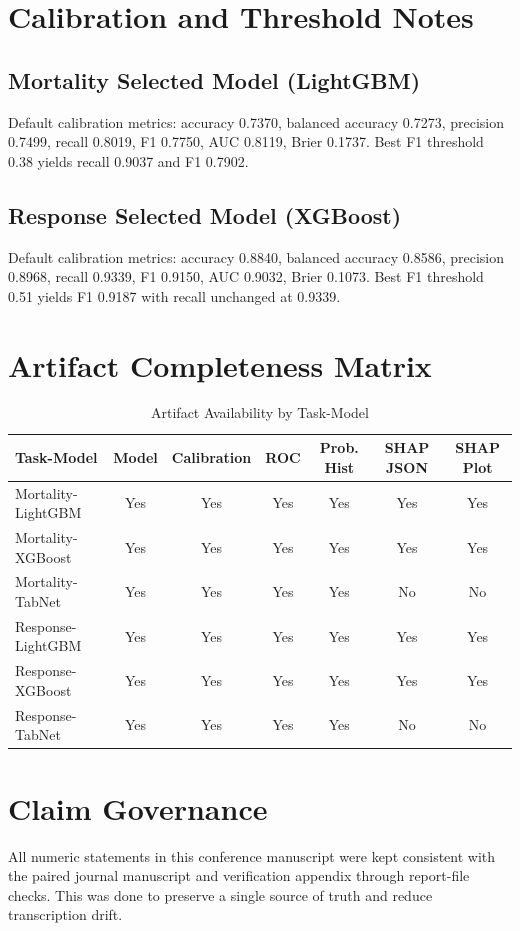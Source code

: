 \documentclass[conference]{IEEEtran}
\begin{document}
\section{Calibration and Threshold Notes}
\subsection{Mortality Selected Model (LightGBM)}
Default calibration metrics: accuracy 0.7370, balanced accuracy 0.7273, precision 0.7499, recall 0.8019, F1 0.7750, AUC 0.8119, Brier 0.1737. Best F1 threshold 0.38 yields recall 0.9037 and F1 0.7902.

\subsection{Response Selected Model (XGBoost)}
Default calibration metrics: accuracy 0.8840, balanced accuracy 0.8586, precision 0.8968, recall 0.9339, F1 0.9150, AUC 0.9032, Brier 0.1073. Best F1 threshold 0.51 yields F1 0.9187 with recall unchanged at 0.9339.

\section{Artifact Completeness Matrix}
\begin{table}[htbp]
\caption{Artifact Availability by Task-Model}
\centering
\small
\begin{tabular}{lcccccc}
\toprule
Task-Model & Model & Calibration & ROC & Prob. Hist & SHAP JSON & SHAP Plot \\
\midrule
Mortality-LightGBM & Yes & Yes & Yes & Yes & Yes & Yes \\
Mortality-XGBoost & Yes & Yes & Yes & Yes & Yes & Yes \\
Mortality-TabNet & Yes & Yes & Yes & Yes & No & No \\
Response-LightGBM & Yes & Yes & Yes & Yes & Yes & Yes \\
Response-XGBoost & Yes & Yes & Yes & Yes & Yes & Yes \\
Response-TabNet & Yes & Yes & Yes & Yes & No & No \\
\bottomrule
\end{tabular}
\end{table}

\section{Claim Governance}
All numeric statements in this conference manuscript were kept consistent with the paired journal manuscript and verification appendix through report-file checks. This was done to preserve a single source of truth and reduce transcription drift.
\end{document}
